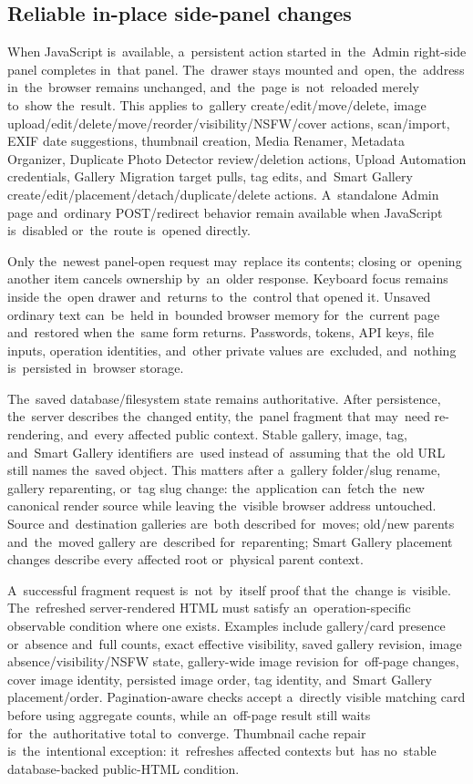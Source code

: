 \documentclass[11pt,a4paper]{article}
\begin{document}
\subsection{Reliable in-place side-panel changes}

When JavaScript is~available, a~persistent action started in~the~Admin
right-side panel completes in~that panel. The~drawer stays mounted and~open,
the~address in~the~browser remains unchanged, and~the~page is~not~reloaded
merely to~show the~result. This applies to~gallery create/edit/move/delete,
image upload/edit/delete/move/reorder/visibility/NSFW/cover actions,
scan/import, EXIF date suggestions, thumbnail creation, Media Renamer, Metadata
Organizer, Duplicate Photo Detector review/deletion actions, Upload Automation
credentials, Gallery Migration target pulls, tag edits, and~Smart Gallery
create/edit/placement/detach/duplicate/delete actions. A~standalone Admin page
and~ordinary POST/redirect behavior remain available when JavaScript is~disabled
or~the~route is~opened directly.

Only the~newest panel-open request may~replace its contents; closing or~opening
another item cancels ownership by~an~older response. Keyboard focus remains
inside the~open drawer and~returns to~the~control that opened it. Unsaved
ordinary text can~be~held in~bounded browser memory for~the~current page
and~restored when the~same form returns. Passwords, tokens, API keys, file
inputs, operation identities, and~other private values are~excluded, and~nothing
is~persisted in~browser storage.

The~saved database/filesystem state remains authoritative. After persistence,
the~server describes the~changed entity, the~panel fragment that may~need
re-rendering, and~every affected public context. Stable gallery, image, tag,
and~Smart Gallery identifiers are~used instead of~assuming that the~old URL
still names the~saved object. This matters after a~gallery folder/slug rename,
gallery reparenting, or~tag slug change: the~application can~fetch the~new
canonical render source while leaving the~visible browser address untouched.
Source and~destination galleries are~both described for~moves; old/new parents
and~the~moved gallery are~described for~reparenting; Smart Gallery placement
changes describe every affected root or~physical parent context.

A~successful fragment request is~not~by~itself proof that the~change is~visible.
The~refreshed server-rendered HTML must satisfy an~operation-specific observable
condition where one exists. Examples include gallery/card presence or~absence
and~full counts, exact effective visibility, saved gallery revision, image
absence/visibility/NSFW state, gallery-wide image revision for~off-page changes,
cover image identity, persisted image order, tag identity, and~Smart Gallery
placement/order. Pagination-aware checks accept a~directly visible matching card
before using aggregate counts, while an~off-page result still waits
for~the~authoritative total to~converge. Thumbnail cache repair
is~the~intentional exception: it~refreshes affected contexts but~has no~stable
database-backed public-HTML condition.
\end{document}
